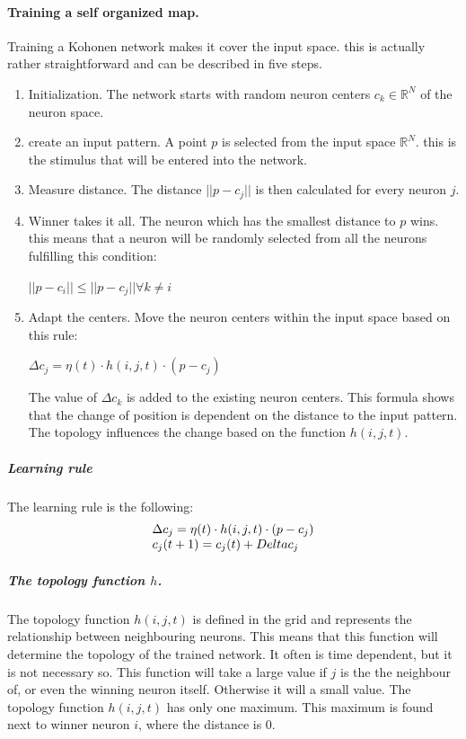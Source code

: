 \documentclass[pdftex,a4paper,12pt,twoside]{report}
\theoremstyle{plain} \newtheorem{theorem}{Theorem} \newtheorem{proposition}{Proposition} \newtheorem{lemma}{Lemma} \newtheorem*{corollary}{Corollary}
\theoremstyle{definition} \newtheorem{definition}{Definition} \newtheorem{conjecture}{Conjecture} \newtheorem*{example}{Example} \newtheorem{algorithm}{Algorithm}
\theoremstyle{remark} \newtheorem*{remark}{Remark} \newtheorem*{note}{Note} \newtheorem{case}{Case}
\begin{document}
\paragraph{Training a self organized map.}
Training a Kohonen network makes it cover the input space. this is actually rather straightforward and can be described in five steps.
\begin{enumerate}
\item Initialization. The network starts with random neuron centers $c_k \in \mathbb{R}^N$ of the neuron space.
\item create an input pattern. A point $p$ is selected from the input space $\mathbb{R}^N$. this is the stimulus that will be entered into the network.
\item Measure distance. The distance $||p-c_j||$ is then calculated for every neuron $j$.
\item Winner takes it all. The neuron which has the smallest distance to $p$ wins. this means that a neuron will be randomly selected from all the neurons fulfilling this condition:
\begin{center}
$||p-c_i|| \leq ||p-c_j|| \forall k \neq i$
\end{center}
\item Adapt the centers. Move the neuron centers within the input space based on this rule:
\begin{center}
$\Delta c_j = \eta (t) \cdot h(i,j,t) \cdot (p-c_j)$
\end{center}
The value of $\Delta c_k$ is added to the existing neuron centers. This formula shows that the change of position is dependent on the distance to the input pattern. The topology influences the change based on the function $h(i,j,t)$.
\end{enumerate}
\subparagraph{Learning rule}
The learning rule is the following:
\begin{equation}
\begin{array}{l l}
\Delta c_j = \eta (t) \cdot h(i,j,t) \cdot (p-c_j) \\
c_j(t+1) = c_j(t) + Delta c_j
\end{array}
\end{equation}
\subparagraph{The topology function $h$.}
The topology function $h(i,j,t)$ is defined in the grid and represents the relationship between neighbouring neurons. This means that this function will determine the topology of the trained network. It often is time dependent, but it is not necessary so. This function will take a large value if $j$ is the the neighbour of, or even the winning neuron itself.  Otherwise it will a small value. The topology function $h(i,j,t)$ has only one maximum. This maximum is found next to winner neuron $i$, where the distance is 0.
\end{document}
